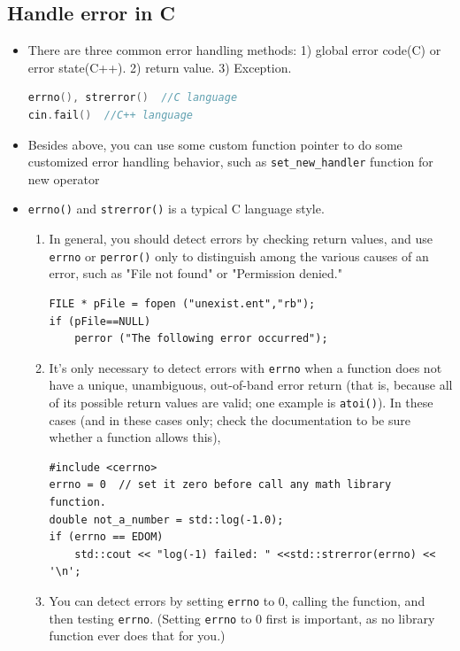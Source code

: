 \documentclass[a4paper,11pt,twoside]{book}
\begin{document}
\subsection{Handle error in C}
\begin{itemize}
	
	\item There are three common error handling methods: 1) global error code(C) or error state(C++). 2) return value. 3) Exception.
\begin{lstlisting}[frame=single, language=c++]
errno(), strerror()  //C language
cin.fail()  //C++ language
\end{lstlisting}

	\item Besides above, you can use some custom function pointer to do some customized error handling behavior, such as \texttt{set\_new\_handler} function for new operator
	
	\item \texttt{errno()} and \texttt{strerror()} is a typical C language style.
	
	\begin{enumerate}
		\item In general, you should detect errors by checking return values, and use \texttt{errno} or \texttt{perror()} only to distinguish among the various causes of an error, such as "File not found" or "Permission denied."
		
\begin{lstlisting}[numbers=none]
FILE * pFile = fopen ("unexist.ent","rb");
if (pFile==NULL)
	perror ("The following error occurred");
\end{lstlisting}
		
		\item It's only necessary to detect errors with \texttt{errno} when a function does not have a unique, unambiguous, out-of-band error return (that is, because all of its possible return values are valid; one example is \texttt{atoi()}). In these cases (and in these cases only; check the documentation to be sure whether a function allows this),
\begin{lstlisting}[numbers=none]
#include <cerrno>
errno = 0  // set it zero before call any math library function.
double not_a_number = std::log(-1.0);
if (errno == EDOM) 
	std::cout << "log(-1) failed: " <<std::strerror(errno) << '\n';
\end{lstlisting}
		\item You can detect errors by setting \texttt{errno} to 0, calling the function, and then testing \texttt{errno}. (Setting \texttt{errno} to 0 first is important, as no library function ever does that for you.)
	\end{enumerate}
	

\end{itemize}
\end{document}
